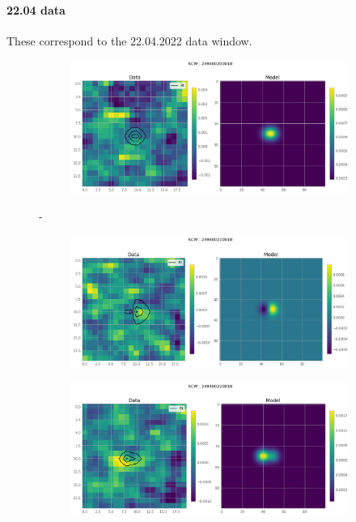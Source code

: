 \documentclass[
	a4paper, %
	10pt, %
	unnumberedsections, %
	twoside, %
]{LTJournalArticle}
\begin{document}
\paragraph{22.04 data}
These correspond to the 22.04.2022 data window.
    \begin{figure}[H]
    \centering
    \begin{subfigure}{.47\textwidth}
        \includegraphics[width=\textwidth]{report/Figures/models/2204/20_psf_notconst.png}
    \end{subfigure}%
    \hspace{1em}-
    \begin{subfigure}{.47\textwidth}
        \centering
        \includegraphics[width=\textwidth]{report/Figures/models/2204/21_psf_notconst.png}
    \end{subfigure}
    \begin{subfigure}{.47\textwidth}
        \centering
        \includegraphics[width=\textwidth]{report/Figures/models/2204/22_psf_notconst.png}

\end{subfigure}
\end{figure}
\end{document}
